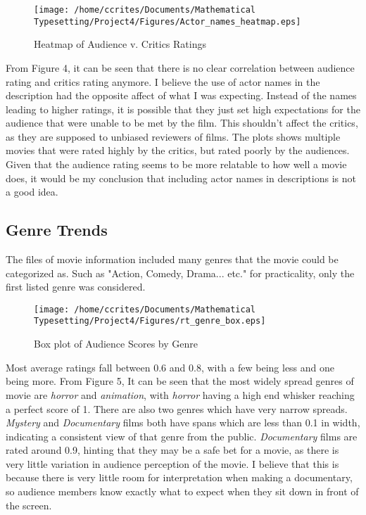 \documentclass[10pt]{article}
\begin{document}
\begin{wrapfigure}{l}{0.55\linewidth}
	\texttt{[image: /home/ccrites/Documents/Mathematical Typesetting/Project4/Figures/Actor\_names\_heatmap.eps]}
	\caption{\label{fig4} Heatmap of Audience v. Critics Ratings}
\end{wrapfigure}

From  Figure 4, it can be seen that there is no clear correlation between audience rating and critics rating anymore. I believe the use of actor names in the description had the opposite affect of what I was expecting. Instead of the names leading to higher ratings, it is possible that they just set high expectations for the audience that were unable to be met by the film. This shouldn't affect the critics, as they are supposed to unbiased reviewers of films. The plots shows multiple movies that were rated highly by the critics, but rated poorly by the audiences. Given that the audience rating seems to be more relatable to how well a movie does, it would be my conclusion that including actor names in descriptions is not a good idea. \\

\subsection*{Genre Trends}
\par The files of movie information included many genres that the movie could be categorized as. Such as "Action, Comedy, Drama... etc." for practicality, only the first listed genre was considered. \\

\begin{wrapfigure}{l}{0.55\linewidth}
	\texttt{[image: /home/ccrites/Documents/Mathematical Typesetting/Project4/Figures/rt\_genre\_box.eps]}
	\caption{\label{fig5} Box plot of Audience Scores by Genre}
\end{wrapfigure}
\par Most average ratings fall between 0.6 and 0.8, with a few being less and one being more. From Figure 5, It can be seen that the most widely spread genres of movie are \textit{horror} and \textit{animation}, with \textit{horror} having a high end whisker reaching a perfect score of 1. There are also two genres which have very narrow spreads. \textit{Mystery} and \textit{Documentary} films both have spans which are less than 0.1 in width, indicating a consistent view of that genre from the public. \textit{Documentary} films are rated around 0.9, hinting that they may be a safe bet for a movie, as there is very little variation in audience perception of the movie. I believe that this is because there is very little room for interpretation when making a documentary, so audience members know exactly what to expect when they sit down in front of the screen.
\end{document}
